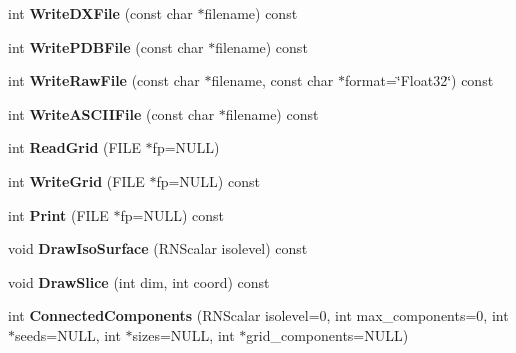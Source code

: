 \begin{DoxyCompactItemize}
\item 
int {\bfseries Write\+D\+X\+File} (const char $\ast$filename) const \hypertarget{class_r3_grid_a487875dd0de1c6b196a5225a82daaf8e}{}\label{class_r3_grid_a487875dd0de1c6b196a5225a82daaf8e}

\item 
int {\bfseries Write\+P\+D\+B\+File} (const char $\ast$filename) const \hypertarget{class_r3_grid_ae55495f0a01ea242a41fba0d18d70f39}{}\label{class_r3_grid_ae55495f0a01ea242a41fba0d18d70f39}

\item 
int {\bfseries Write\+Raw\+File} (const char $\ast$filename, const char $\ast$format=\char`\"{}Float32\char`\"{}) const \hypertarget{class_r3_grid_a23cc33223de23944e0981d4e3418f8e1}{}\label{class_r3_grid_a23cc33223de23944e0981d4e3418f8e1}

\item 
int {\bfseries Write\+A\+S\+C\+I\+I\+File} (const char $\ast$filename) const \hypertarget{class_r3_grid_af99bbc9803c4ba353b1ed827df3e55ae}{}\label{class_r3_grid_af99bbc9803c4ba353b1ed827df3e55ae}

\item 
int {\bfseries Read\+Grid} (F\+I\+LE $\ast$fp=N\+U\+LL)\hypertarget{class_r3_grid_aa367041ef94f3b1522a4b20b0e1dc8c6}{}\label{class_r3_grid_aa367041ef94f3b1522a4b20b0e1dc8c6}

\item 
int {\bfseries Write\+Grid} (F\+I\+LE $\ast$fp=N\+U\+LL) const \hypertarget{class_r3_grid_ab4067f174ca605944084d35a1947bb98}{}\label{class_r3_grid_ab4067f174ca605944084d35a1947bb98}

\item 
int {\bfseries Print} (F\+I\+LE $\ast$fp=N\+U\+LL) const \hypertarget{class_r3_grid_aab5a8d561a87e6d13adb20d1215b1ae5}{}\label{class_r3_grid_aab5a8d561a87e6d13adb20d1215b1ae5}

\item 
void {\bfseries Draw\+Iso\+Surface} (R\+N\+Scalar isolevel) const \hypertarget{class_r3_grid_ae61a2b8a9c2376f443b8175ce25f1101}{}\label{class_r3_grid_ae61a2b8a9c2376f443b8175ce25f1101}

\item 
void {\bfseries Draw\+Slice} (int dim, int coord) const \hypertarget{class_r3_grid_ad146648fa5ece973c19f43e4b56cf7f5}{}\label{class_r3_grid_ad146648fa5ece973c19f43e4b56cf7f5}

\item 
int {\bfseries Connected\+Components} (R\+N\+Scalar isolevel=0, int max\+\_\+components=0, int $\ast$seeds=N\+U\+LL, int $\ast$sizes=N\+U\+LL, int $\ast$grid\+\_\+components=N\+U\+LL)\hypertarget{class_r3_grid_aafbf43b3ca3e76d8a61293d65e49fc4f}{}\label{class_r3_grid_aafbf43b3ca3e76d8a61293d65e49fc4f}


\end{DoxyCompactItemize}
